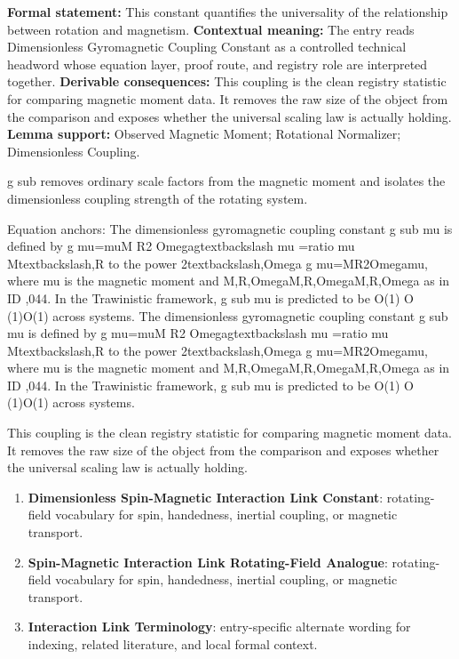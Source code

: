 \begingroup\footnotesize\setlength{\emergencystretch}{3em}\sloppy
\textbf{Formal statement:} This constant quantifies the universality of the relationship between rotation and magnetism. \textbf{Contextual meaning:} The entry reads Dimensionless Gyromagnetic Coupling Constant as a controlled technical headword whose equation layer, proof route, and registry role are interpreted together. \textbf{Derivable consequences:} This coupling is the clean registry statistic for comparing magnetic moment data. It removes the raw size of the object from the comparison and exposes whether the universal scaling law is actually holding. \textbf{Lemma support:} Observed Magnetic Moment; Rotational Normalizer; Dimensionless Coupling.\par
\endgroup

g sub removes ordinary scale factors from the magnetic moment and isolates the dimensionless coupling strength of the rotating system.

Equation anchors: The dimensionless gyromagnetic coupling constant g sub mu is defined by g mu=muM R2 Omegagtextbackslash mu =ratio mu Mtextbackslash,R to the power 2textbackslash,Omega g mu=MR2Omegamu, where mu is the magnetic moment and M,R,OmegaM,R,OmegaM,R,Omega as in ID ,044. In the Trawinistic framework, g sub mu is predicted to be O(1) O (1)O(1) across systems. The dimensionless gyromagnetic coupling constant g sub mu is defined by g mu=muM R2 Omegagtextbackslash mu =ratio mu Mtextbackslash,R to the power 2textbackslash,Omega g mu=MR2Omegamu, where mu is the magnetic moment and M,R,OmegaM,R,OmegaM,R,Omega as in ID ,044. In the Trawinistic framework, g sub mu is predicted to be O(1) O (1)O(1) across systems.

This coupling is the clean registry statistic for comparing magnetic moment data. It removes the raw size of the object from the comparison and exposes whether the universal scaling law is actually holding.
\endgroup

\begingroup\footnotesize\sloppy
\begin{enumerate}[leftmargin=1.35em,itemsep=1pt,topsep=1pt,parsep=0pt]
\item \textbf{Dimensionless Spin-Magnetic Interaction Link Constant}: rotating-field vocabulary for spin, handedness, inertial coupling, or magnetic transport.
\item \textbf{Spin-Magnetic Interaction Link Rotating-Field Analogue}: rotating-field vocabulary for spin, handedness, inertial coupling, or magnetic transport.
\item \textbf{Interaction Link Terminology}: entry-specific alternate wording for indexing, related literature, and local formal context.
\end{enumerate}
\endgroup

